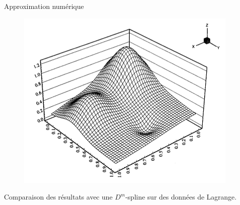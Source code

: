 \documentclass[final]{beamer}
\newlength{\onecolwid}
\newlength{\twocolwid}
\begin{document}
\begin{frame}[t]
\begin{columns}[t]
\begin{column}{\twocolwid}
\begin{columns}[t,totalwidth=\twocolwid]
\begin{column}{\onecolwid}
\begin{block}{Approximation numérique}
\begin{figure}[!h]
\includegraphics[scale=1.4]{CGOUT4.jpg}
\end{figure}
Comparaison des résultats avec une $D^m$-spline sur des données de Lagrange.\\
\end{block}
\end{column} %


\end{columns}
\end{column}
\end{columns}
\end{frame}
\end{document}
